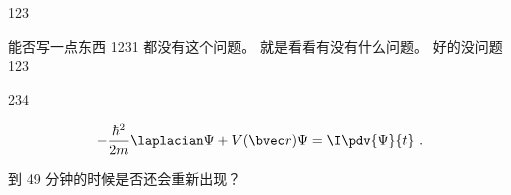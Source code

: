 
123

能否写一点东西
1231
都没有这个问题。 就是看看有没有什么问题。 好的没问题
123

234

\begin{equation}
-\frac{\hbar^2}{2m}\laplacian\Psi + V(\bvec r)\Psi = \I\pdv{\Psi}{t}~.
\end{equation}

到 49 分钟的时候是否还会重新出现？
